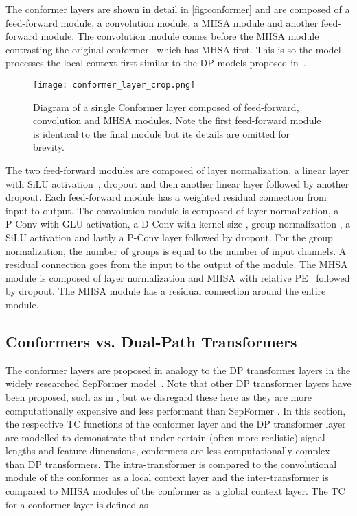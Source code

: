 The conformer layers are shown in detail in \autoref{fig:conformer} and are composed of a feed-forward module, a convolution module, a \ac{MHSA} module and another feed-forward module. 
The convolution module comes before the \ac{MHSA} module contrasting the original conformer~\cite{conformer} which has \ac{MHSA} first. This is so the model processes the local context first similar to the \ac{DP} models proposed in~\cite{dprnn, sepformer}.
\begin{figure}[!t]
    \centering
    \texttt{[image: conformer\_layer\_crop.png]}
    \caption{Diagram of a single Conformer layer composed of feed-forward, convolution and \ac{MHSA} modules. Note the first feed-forward module is identical to the final module but its details are omitted for brevity.}
    \label{fig:conformer}
\end{figure}
The two feed-forward modules are composed of layer normalization, a linear layer with \ac{SiLU} activation~\cite{silu}, dropout \cite{dropout} and then another linear layer followed by another dropout. Each feed-forward module has a weighted residual connection from input to output.
The convolution module is composed of layer normalization, a \ac{P-Conv} with \ac{GLU} activation, a \ac{D-Conv} with kernel size , group normalization \cite{groupnorm}, a \ac{SiLU} activation and lastly a \ac{P-Conv} layer followed by dropout. For the group normalization, the number of groups is equal to the number of input channels. A residual connection goes from the input to the output of the module.
The \ac{MHSA} module is composed of layer normalization and \ac{MHSA} with relative \ac{PE}~\cite{Vaswani} followed by dropout. The \ac{MHSA} module has a residual connection around the entire module.

\subsection{Conformers vs. Dual-Path Transformers}\label{sec:td-conformer:vsdpt}
The conformer layers are proposed in analogy to the \ac{DP} transformer layers in the widely researched SepFormer model~\cite{sepformer,IWAENCbestpaper}. Note that other \ac{DP} transformer layers have been proposed, such as in \cite{dptnet}, but we disregard these here as they are more computationally expensive and less performant than SepFormer \cite{sepformer,sudormrf}. 
In this section, the respective \ac{TC} functions of the conformer layer and the \ac{DP} transformer layer are modelled to demonstrate that under certain (often more realistic) signal lengths and feature dimensions, conformers are less computationally complex than \ac{DP} transformers.
The intra-transformer is compared to the convolutional module of the conformer as a local context layer and the inter-transformer is compared to \ac{MHSA} modules of the conformer as a global context layer. The \ac{TC} for a conformer layer is defined as 

